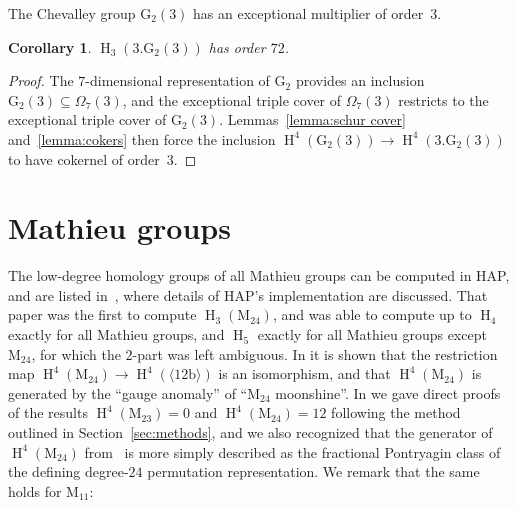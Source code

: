 \documentclass[pdftex]{sigma}
\numberwithin{equation}{section}
\newtheorem{Corollary}[Theorem]{Corollary}
\newcommand\rb{\mathrm b}
\newcommand\rM{\mathrm M}
\DeclareMathOperator\homology{H}
\renewcommand\H{\homology}
\newcommand\<\langle
\renewcommand\>\rangle
\begin{document}
The Chevalley group $\mathrm{G}_2(3)$ has an exceptional multiplier of order~$3$.

\begin{Corollary} $\H_3(3.\mathrm{G}_2(3))$ has order $72$.
\end{Corollary}
\begin{proof} The $7$-dimensional representation of $\mathrm{G}_2$ provides an inclusion $\mathrm{G}_2(3) \subseteq \Omega_7(3)$, and the exceptional triple cover of $\Omega_7(3)$ restricts to the exceptional triple cover of $\mathrm{G}_2(3)$. Lemmas~\ref{lemma:schur cover} and~\ref{lemma:cokers} then force the inclusion $\H^4(\mathrm{G}_2(3)) \to \H^4(3.\mathrm{G}_2(3))$ to have cokernel of order~$3$.
\end{proof}

\section{Mathieu groups} \label{sec:Mathieu}

The low-degree homology groups of all Mathieu groups can be computed in HAP, and are listed in~\cite{SE09}, where details of HAP's implementation are discussed. That paper was the first to compute $\H_3(\rM_{24})$, and was able to compute up to $\H_4$ exactly for all Mathieu groups, and $\H_5$ exactly for all Mathieu groups except $\rM_{24}$, for which the $2$-part was left ambiguous. In \cite{GPRV} it is shown that the restriction map $\H^4(\rM_{24}) \to \H^4(\langle 12\rb\rangle)$ is an isomorphism, and that $\H^4(\rM_{24})$ is generated by the ``gauge anomaly'' of ``$\rM_{24}$ moonshine''. In \cite[Theorems~5.1 and~5.2]{jft} we gave direct proofs of the results $\H^4(\rM_{23}) = 0$ and $\H^4(\rM_{24}) = 12$ following the method outlined in Section~\ref{sec:methods}, and we also recognized that the generator of $\H^4(\rM_{24})$ from~\cite{GPRV} is more simply described as the fractional Pontryagin class of the defining degree-$24$ permutation representation. We remark that the same holds for $\rM_{11}$:
\end{document}
